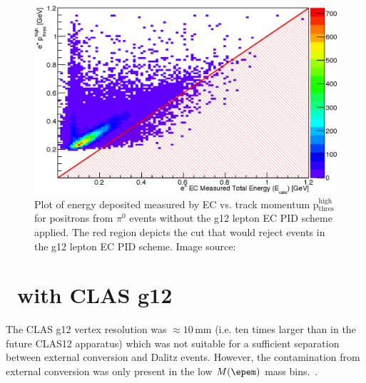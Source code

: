 \begin{figure}\begin{center}
											\includegraphics[width=0.8\figwidth]{figures/lepton/Pip_EChighcut.eps}
											\caption[EC Deposited Energy Comparison to Track Momentum for $e^+$ from $\pi^0$ Events]{\label{fig:islep.pipECcut}Plot of energy deposited measured by EC vs. track momentum p$\mathrm{_{thres}^{high}}$ for positrons from $\pi^0$ events without the g12 lepton EC PID scheme applied. The red region depicts the cut that would reject events in the g12 lepton EC PID scheme. Image source:~\cite{thesiskunkel}}
\end{center}\end{figure}																											
\FloatBarrier

\section{\etaPDal \  with CLAS g12}
The CLAS g12 vertex resolution was $\approx 10\,\mathrm{mm}$ (i.e. ten times larger than in the future CLAS12 apparatus) which was not suitable for a sufficient separation between external conversion and Dalitz events. However, the contamination from external conversion was only present in the low $M(\epem)$ mass bins.~\cite{thesisschever}.

